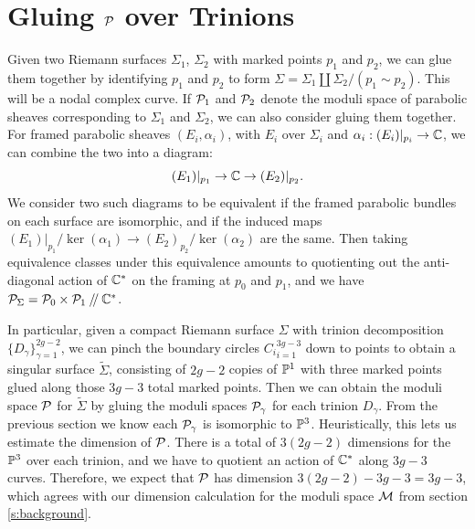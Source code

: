 	\section{Gluing $\mathcal{P}$ over Trinions }
	\label{s:p-gluing}
	Given two Riemann surfaces $\Sigma_1$, $\Sigma_2$ with marked points $p_1$ and $p_2$, we can glue them together by identifying $p_1$ and $p_2$ to form $\Sigma = \Sigma_1 \coprod \Sigma_2 / (p_1 \sim p_2)$. This will be a nodal complex curve. If $\mathcal{P}_1$ and $\mathcal{P}_2$ denote the moduli space of parabolic sheaves corresponding to $\Sigma_1$ and $\Sigma_2$, we can also consider gluing them together. For framed parabolic sheaves $(E_i,\alpha_i)$, with $E_i$ over $\Sigma_i$ and $\alpha_i:(E_i)|_{p_i}\to \mathbb{C}$, we can combine the two into a diagram:
	\begin{equation}
		(E_1)|_{p_1} \to \mathbb{C} \rightarrow (E_2)|_{p_2}.
	\end{equation}
	We consider two such diagrams to be equivalent if the framed parabolic bundles on each surface are isomorphic, and if the induced maps $(E_1)|_{p_1}/\ker(\alpha_1) \to (E_2)_{p_2}/\ker(\alpha_2)$ are the same. Then taking equivalence classes under this equivalence amounts to quotienting out the anti-diagonal action of $\mathbb{C}^\ast$ on the framing at $p_0$ and $p_1$, and we have $\mathcal{P}_{\Sigma} = \mathcal{P}_0 \times \mathcal{P}_1 \mathbin{/\mkern-4mu/} \mathbb{C}^\ast$. 
	
	In particular, given a compact Riemann surface $\Sigma$ with trinion decomposition $\{D_\gamma\}_{\gamma=1}^{2g-2}$, we can pinch the boundary circles ${C_i}_{i=1}^{3g-3}$ down to points to obtain a singular surface $\tilde{\Sigma}$, consisting of $2g-2$ copies of $\mathbb{P}^1$ with three marked points glued along those $3g-3$ total marked points. Then we can obtain the moduli space $\mathcal{P}$ for $\tilde{\Sigma}$ by gluing the moduli spaces $\mathcal{P}_\gamma$ for each trinion $D_\gamma$. From the previous section we know each $\mathcal{P}_\gamma$ is isomorphic to $\mathbb{P}^3$. Heuristically, this lets us estimate the dimension of $\mathcal{P}$. There is a total of $3(2g-2)$ dimensions for the $\mathbb{P}^3$ over each trinion, and we have to quotient an action of $\mathbb{C}^\ast$ along $3g-3$ curves. Therefore, we expect that $\mathcal{P}$ has dimension $3(2g-2)-3g-3 = 3g-3$, which agrees with our dimension calculation for the moduli space $\mathcal{M}$ from section \ref{s:background}. 
	

